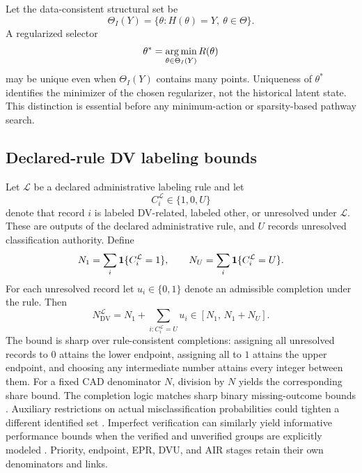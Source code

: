 \documentclass[11pt]{article}
\begin{document}
Let the data-consistent structural set be
\begin{equation}
\Theta_I(Y)=\{\theta:H(\theta)=Y,\ \theta\in\Theta\}.
\end{equation}
A regularized selector
\begin{equation}
\theta^*=\operatorname*{arg\,min}_{\theta\in\Theta_I(Y)}R(\theta)
\end{equation}
may be unique even when $\Theta_I(Y)$ contains many points. Uniqueness of $\theta^*$ identifies the minimizer of the chosen regularizer, not the historical latent state. This distinction is essential before any minimum-action or sparsity-based pathway search.

\subsection{Declared-rule DV labeling bounds}
\label{sec:dv_bounds_appendix}

Let $\mathcal L$ be a declared administrative labeling rule and let
\begin{equation}
C_i^{\mathcal L}\in\{1,0,U\}
\end{equation}
denote that record $i$ is labeled DV-related, labeled other, or unresolved under $\mathcal L$. These are outputs of the declared administrative rule, and $U$ records unresolved classification authority. Define
\begin{equation}
N_1=\sum_i\mathbf{1}\{C_i^{\mathcal L}=1\},
\qquad
N_U=\sum_i\mathbf{1}\{C_i^{\mathcal L}=U\}.
\end{equation}
For each unresolved record let $u_i\in\{0,1\}$ denote an admissible completion under the rule. Then
\begin{equation}
N_{\mathrm{DV}}^{\mathcal L}
=N_1+\sum_{i:C_i^{\mathcal L}=U}u_i
\in[N_1,\,N_1+N_U].
\label{eq:dv_rule_bound_appendix}
\end{equation}
The bound is sharp over rule-consistent completions: assigning all unresolved records to $0$ attains the lower endpoint, assigning all to $1$ attains the upper endpoint, and choosing any intermediate number attains every integer between them. For a fixed CAD denominator $N$, division by $N$ yields the corresponding share bound. The completion logic matches sharp binary missing-outcome bounds \citep{Manski2003}. Auxiliary restrictions on actual misclassification probabilities could tighten a different identified set \citep{Molinari2008}. Imperfect verification can similarly yield informative performance bounds when the verified and unverified groups are explicitly modeled \citep{DominitzSherman2006}. Priority, endpoint, EPR, DVU, and AIR stages retain their own denominators and links.
\end{document}

